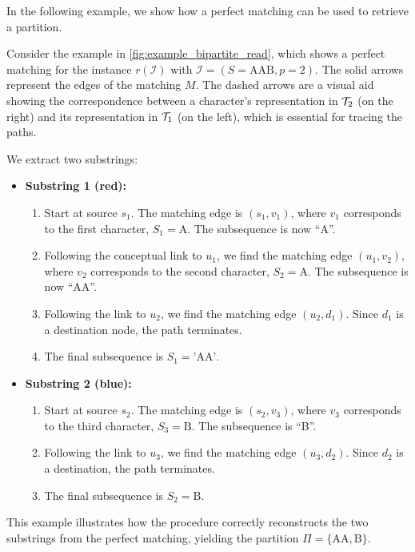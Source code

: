 In the following example, we show how a perfect matching can be used to retrieve a partition.
\begin{example}
    Consider the example in \cref{fig:example_bipartite_read}, which shows a perfect matching for the instance $r(\mathcal{I})$ with $\mathcal{I}=(S=\text{AAB}, p=2)$. The solid arrows represent the edges of the matching $M$. The dashed arrows are a visual aid showing the correspondence between a character's representation in $\mathcal{T}_{2}$ (on the right) and its representation in $\mathcal{T}_{1}$ (on the left), which is essential for tracing the paths.

    We extract two substrings:

    \begin{itemize}
        \item \textbf{Substring 1 (red):}
        \begin{enumerate}
            \item Start at source $s_1$. The matching edge is $(s_1, v_1)$, where $v_1$ corresponds to the first character, $S_1 = \text{A}$. The subsequence is now ``A''.
            \item Following the conceptual link to $u_1$, we find the matching edge $(u_1, v_2)$, where $v_2$ corresponds to the second character, $S_2 = \text{A}$. The subsequence is now ``AA''.
            \item Following the link to $u_2$, we find the matching edge $(u_2, d_1)$. Since $d_1$ is a destination node, the path terminates.
            \item The final subsequence is $S_1 = \text{'AA'}$.
        \end{enumerate}

        \item \textbf{Substring 2 (blue):}
        \begin{enumerate}
            \item Start at source $s_2$. The matching edge is $(s_2, v_3)$, where $v_3$ corresponds to the third character, $S_3 = \text{B}$. The subsequence is ``B''.
            \item Following the link to $u_3$, we find the matching edge $(u_3, d_2)$. Since $d_2$ is a destination, the path terminates.
            \item The final subsequence is $S_2 = \text{B}$.
        \end{enumerate}
    \end{itemize}
    This example illustrates how the procedure correctly reconstructs the two substrings from the perfect matching, yielding the partition $\Pi = \{\text{AA}, \text{B}\}$.
    \begin{figure}[H]
        \centering
\end{figure}
\end{example}
